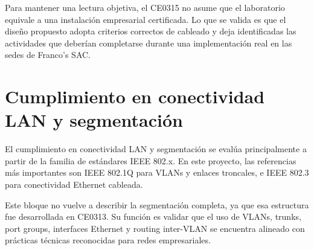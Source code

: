\documentclass[11pt, a4paper, oneside]{report}
\begin{document}
Para mantener una lectura objetiva, el CE0315 no asume que el laboratorio equivale a una instalación empresarial certificada. Lo que se valida es que el diseño propuesto adopta criterios correctos de cableado y deja identificadas las actividades que deberían completarse durante una implementación real en las sedes de Franco's SAC.

\section{Cumplimiento en conectividad LAN y segmentación}

El cumplimiento en conectividad LAN y segmentación se evalúa principalmente a partir de la familia de estándares IEEE 802.x. En este proyecto, las referencias más importantes son IEEE 802.1Q para VLANs y enlaces troncales, e IEEE 802.3 para conectividad Ethernet cableada.

Este bloque no vuelve a describir la segmentación completa, ya que esa estructura fue desarrollada en CE0313. Su función es validar que el uso de VLANs, trunks, port groups, interfaces Ethernet y routing inter-VLAN se encuentra alineado con prácticas técnicas reconocidas para redes empresariales.

\renewcommand{\arraystretch}{1.3}
\footnotesize
{}
\end{document}
